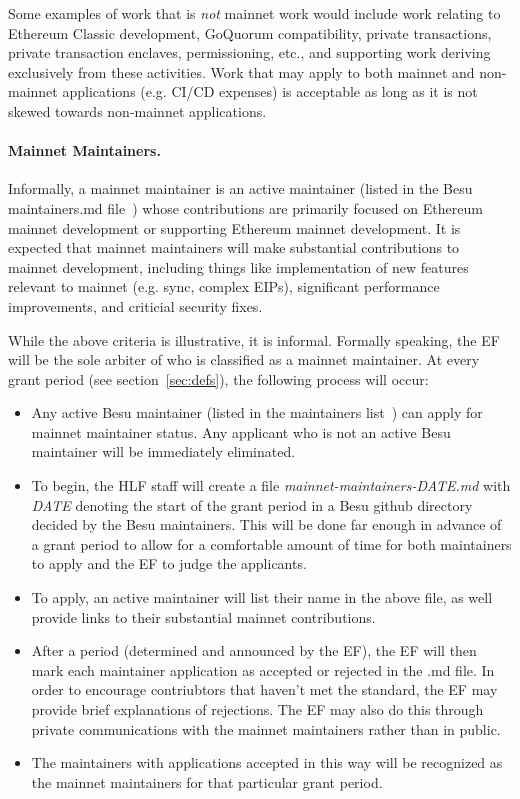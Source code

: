 Some examples of work that is \emph{not} mainnet work would include work relating to Ethereum Classic development, GoQuorum compatibility, private transactions, private transaction enclaves, permissioning, etc., and supporting work deriving exclusively from these activities.  Work that may apply to both mainnet and non-mainnet applications (e.g. CI/CD expenses) is acceptable as long as it is not skewed towards non-mainnet applications.

\paragraph{Mainnet Maintainers.} Informally, a mainnet maintainer is an active maintainer (listed in the Besu maintainers.md file~\cite{BesuM}) whose contributions are primarily focused on Ethereum mainnet development or supporting Ethereum mainnet development.  It is expected that mainnet maintainers will make substantial contributions to mainnet development, including things like implementation of new features relevant to mainnet (e.g. sync, complex EIPs), significant performance improvements, and criticial security fixes.

While the above criteria is illustrative, it is informal.  Formally speaking, the EF will be the sole arbiter of who is classified as a mainnet maintainer.  At every grant period (see section~\ref{sec:defs}), the following process will occur:
\begin{itemize}
\item Any active Besu maintainer (listed in the maintainers list~\cite{BesuM}) can apply for mainnet maintainer status.  Any applicant who is not an active Besu maintainer will be immediately eliminated.
\item To begin, the HLF staff will create a file \emph{mainnet-maintainers-DATE.md} with \emph{DATE} denoting the start of the grant period in a Besu github directory decided by the Besu maintainers.  This will be done far enough in advance of a grant period to allow for a comfortable amount of time for both maintainers to apply and the EF to judge the applicants.
\item To apply, an active maintainer will list their name in the above file, as well provide links to their substantial mainnet contributions.
\item After a period (determined and announced by the EF), the EF will then mark each maintainer application as accepted or rejected in the .md file.  In order to encourage contriubtors that haven't met the standard, the EF may provide brief explanations of rejections.  The EF may also do this through private communications with the mainnet maintainers rather than in public.
\item The maintainers with applications accepted in this way will be recognized as the mainnet maintainers for that particular grant period.
\end{itemize}

